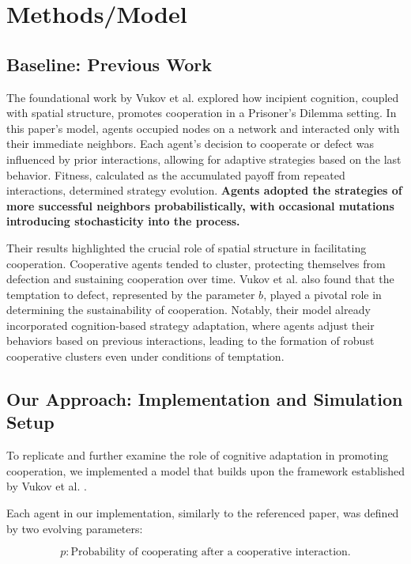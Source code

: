 \documentclass[runningheads]{llncs}
\begin{document}
\section{Methods/Model}

\subsection{Baseline: Previous Work}

The foundational work by Vukov et al. \cite{vukov} explored how incipient cognition, coupled with
spatial structure, promotes cooperation in a Prisoner’s Dilemma setting.
In this paper's model, agents occupied nodes on a network and interacted only with their
immediate neighbors. Each agent's decision to cooperate or defect was influenced
by prior interactions, allowing for adaptive strategies based on the last behavior.
Fitness, calculated as the accumulated payoff from repeated interactions,
determined strategy evolution. \textbf{Agents adopted the strategies of more successful neighbors probabilistically, with occasional mutations introducing stochasticity into the process.}

Their results highlighted the crucial role of spatial structure in facilitating cooperation.
Cooperative agents tended to cluster, protecting themselves from defection and
sustaining cooperation over time. Vukov et al. also found that the temptation to
defect, represented by the parameter \( b \), played a pivotal role in determining
the sustainability of cooperation. Notably, their model already incorporated
cognition-based strategy adaptation, where agents adjust their behaviors based on
previous interactions, leading to the formation of robust cooperative clusters even
under conditions of temptation.


\subsection{Our Approach: Implementation and Simulation Setup}

To replicate and further examine the role of cognitive adaptation in promoting
cooperation, we implemented a model that builds upon the framework established
by Vukov et al. \cite{vukov}.

Each agent in our implementation, similarly to the referenced paper, was defined by
two evolving parameters:

\[
p: \text{Probability of cooperating after a cooperative interaction.}
\]
\end{document}
